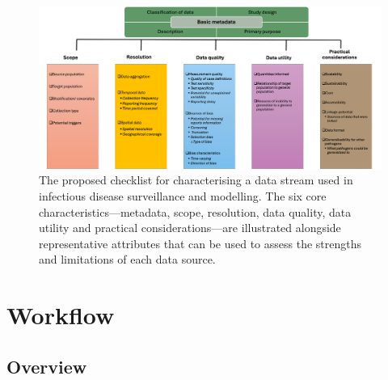 \documentclass{article}
\begin{document}
\begin{figure}[H] 
\includegraphics[width=1\linewidth]{figures/data_characteristics_2.png}
\centering
\caption{The proposed checklist for characterising a data stream used in infectious disease surveillance and modelling. The six core characteristics---metadata, scope, resolution, data quality, data utility and practical considerations---are illustrated alongside representative attributes that can be used to assess the strengths and limitations of each data source. }
\label{data_characteristics}
\end{figure}


\section{Workflow}

\subsection{Overview}
\end{document}
